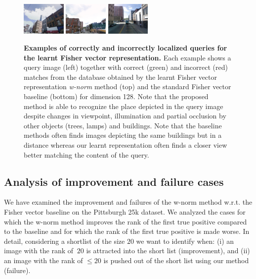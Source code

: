 \begin{figure}[h]
\begin{minipage}{0.75\linewidth}
\begin{minipage}{\linewidth}
              \colorbox{myGreen}{\includegraphics[height=16mm]{imgs/ex4/FV2.jpg}}
              \colorbox{myRed}{\includegraphics[height=16mm]{imgs/ex4/FV3.jpg}}
              \colorbox{myRed}{\includegraphics[height=16mm]{imgs/ex4/FV4.jpg}}
          \end{minipage} 
      \end{minipage}
      \caption{
          \textbf{Examples of correctly and incorrectly localized queries for the learnt Fisher vector representation.}
          Each example shows a query image (left) together with correct (green) and incorrect (red) matches from the database obtained by the learnt Fisher vector representation \emph{w-norm} method (top) and the standard Fisher vector baseline (bottom) for dimension 128. Note that the proposed method is able to recognize the place depicted in the query image despite changes in viewpoint, illumination and partial occlusion by other objects (trees, lamps) and buildings. 
          Note that the baseline methods often finds images depicting the same buildings but in a distance whereas our learnt representation often finds a closer view better matching the content of the query.        
      }
      \label{fig:images_bow}
    \end{figure}


  \subsection{{Analysis of improvement and failure cases}}
  \label{sec:failures}
      {
        We have examined the improvement and failures of the w-norm method w.r.t. the Fisher vector baseline on the Pittsburgh 25k dataset. We analyzed the cases for which the w-norm method improves the rank of the first true positive compared to the baseline and for which the rank of the first true positive is made worse. In detail, considering a shortlist of the size $20$ we want to identify when: (i) an image with the rank of $\> 20$ is attracted into the short list (improvement), and (ii) an image with the rank of $\leq 20$ is pushed out of the short list using our method (failure).
      }

